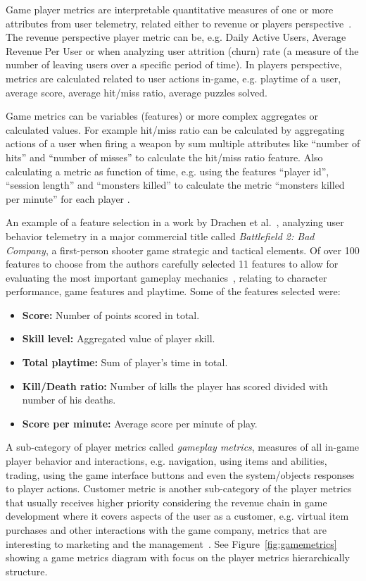 Game player metrics are interpretable quantitative measures of one or more attributes from user telemetry, related either to revenue or players perspective~\citep{Drachen:2013Basics}. The revenue perspective player metric can be, e.g. Daily Active Users, Average Revenue Per User or when analyzing user attrition (churn) rate (a measure of the number of leaving users over a specific period of time). In players perspective, metrics are calculated related to user actions in-game, e.g. playtime of a user, average score, average hit/miss ratio, average puzzles solved. 

Game metrics can be variables (features) or more complex aggregates or calculated values. For example hit/miss ratio can be calculated by aggregating actions of a user when firing a weapon by sum multiple attributes like ``number of hits'' and ``number of misses'' to calculate the hit/miss ratio feature. Also calculating a metric as function of time, e.g. using the features ``player id'', ``session length'' and ``monsters killed'' to calculate the metric ``monsters killed per minute'' for each player \citep{Drachen:2013Basics}.

An example of a feature selection in a work by Drachen et al.~\citep{Drachen:2012}, analyzing user behavior telemetry in a major commercial title called \textit{Battlefield 2: Bad Company}, a first-person shooter game strategic and tactical elements. Of over 100 features to choose from the authors carefully selected 11 features to allow for evaluating the most important gameplay mechanics~\citep{Drachen:2009Tomb}, relating to character performance, game features and playtime. Some of the features selected were:
\begin{itemize}
\item \textbf{Score:} Number of points scored in total.
\item \textbf{Skill level:} Aggregated value of player skill.
\item \textbf{Total playtime:} Sum of player's time in total.
\item \textbf{Kill/Death ratio:} Number of kills the player has scored divided with number of his deaths.
\item \textbf{Score per minute:} Average score per minute of play.
\end{itemize}

A sub-category of player metrics called \textit{gameplay metrics}, measures of all in-game player behavior and interactions, e.g. navigation, using items and abilities, trading, using the game interface buttons and even the system/objects responses to player actions. Customer metric is another sub-category of the player metrics that usually receives higher priority considering the revenue chain in game development where it covers aspects of the user as a customer, e.g. virtual item purchases and other interactions with the game company, metrics that are interesting to marketing and the management~\citep{Drachen:2013Basics}. See Figure~\ref{fig:gamemetrics} showing a game metrics diagram with focus on the player metrics hierarchically structure.

